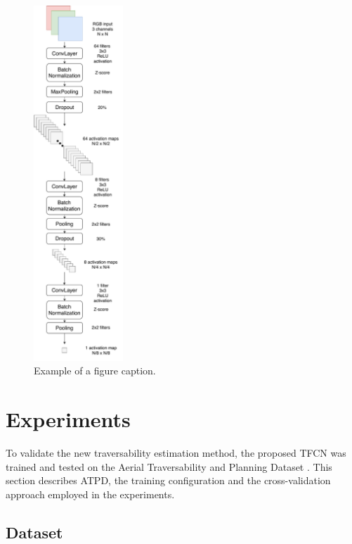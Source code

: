 \documentclass[conference]{IEEEtran}
\begin{document}
\begin{figure}[htbp]
\centerline{\includegraphics[width=0.3\textwidth]{graphics/TFCN.pdf}}
\caption{Example of a figure caption.}
\label{fig}
\end{figure}

\section{Experiments}
\label{section:experiments}

To validate the new traversability estimation method, the proposed TFCN was trained and tested on the Aerial Traversability and Planning Dataset \cite{borges:2019}.
This section describes ATPD, the training configuration and the cross-validation approach employed in the experiments.

\subsection{Dataset}
\end{document}
